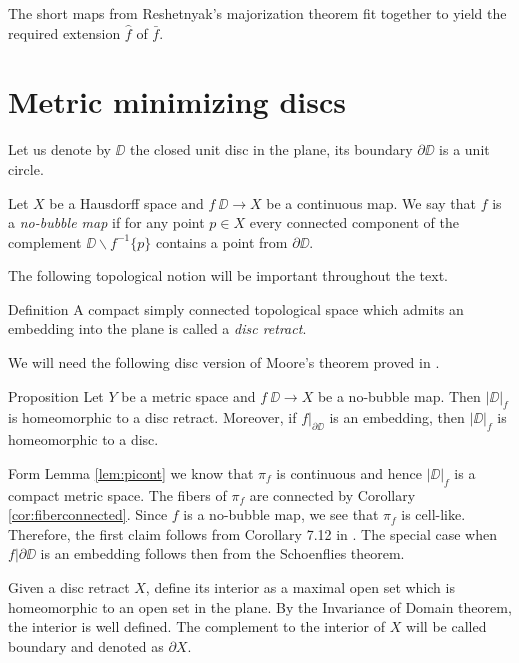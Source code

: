 \documentclass[a4paper,10pt]{amsart}
\begin{document}
The short maps from Reshetnyak's majorization theorem fit together to yield the required extension $\hat f$ of $\bar f$.
\qeds







\section{Metric minimizing discs}



Let us denote by $\DD$ the closed unit disc in the plane,
its boundary $\partial \DD$ is a unit circle.

Let $X$ be a Hausdorff space and
$f\:\DD\to X$ be a continuous map.
We say that $f$ is a \emph{no-bubble map}
if for any point $p\in X$ every connected component of the complement $\DD\backslash f^{-1}\{p\}$ contains a point from $\partial \DD$.

The following topological notion will be important throughout the text.

\begin{thm}{Definition}
A compact simply connected topological space which admits an embedding into the plane is 
called a \emph{disc retract}. 
\end{thm}




We will need the following disc version of Moore's theorem \cite{moore} proved in \cite{LW3}.

\begin{thm}{Proposition}\label{prop:disc-moore}
Let $Y$ be a metric space and
$f\:\DD\to X$ be a no-bubble map.
Then $|\DD|_f$ is homeomorphic to a disc retract. Moreover, if $f|_{\partial\DD}$ is 
an embedding, then $|\DD|_f$ is homeomorphic to a disc.
\end{thm}


Form Lemma \ref{lem:picont} we know that $\pi_f$ is continuous and hence $|\DD|_f$
is a compact metric space. The fibers of $\pi_f$ are connected by Corollary \ref{cor:fiberconnected}.
Since $f$ is a no-bubble map, we see that $\pi_f$ is cell-like. Therefore, the first claim follows from 
Corollary 7.12 in \cite{LW3}.
The special case when $f|{\partial\DD}$ is an embedding follows then from the Schoenflies theorem.
\qeds

Given a disc retract $X$,
define its interior as a maximal open set which is homeomorphic to an open set in the plane.
By the Invariance of Domain theorem, the interior is well defined.
The complement to the interior of $X$ will be called boundary and denoted as $\partial X$.
\end{document}
